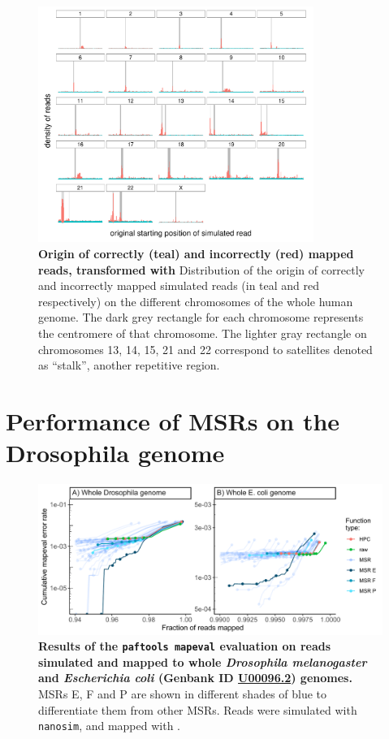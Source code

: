 \documentclass[
  11pt,
  twoside]{scrbook}
\newcommand{\extcaption}[2]{
    \caption[#1]{
        \textbf{#1}\newline
        #2
    }
}
\begin{document}
\begin{figure}[H]
    \centering
    \includegraphics[width=0.8\textwidth]{figures/HPC-MSRs/msr_f2_distrib.centro.pdf}
    \extcaption{Origin of correctly (teal) and incorrectly (red) mapped reads, transformed with \msr{F}}{Distribution of the origin of correctly and incorrectly mapped simulated reads (in teal and red respectively) on the different chromosomes of the whole human genome. The dark grey rectangle for each chromosome represents the centromere of that chromosome. The lighter gray rectangle on chromosomes 13, 14, 15, 21 and 22 correspond to satellites denoted as ``stalk'', another repetitive region.}
    \label{fig:hist-msr-f}
\end{figure}

\hypertarget{performance-of-msrs-on-the-drosophila-genome}{%
\section{Performance of MSRs on the Drosophila genome}\label{performance-of-msrs-on-the-drosophila-genome}}

\begin{figure}[H]
    \centering
    \includegraphics[width=\textwidth]{figures/HPC-MSRs/droso_ecoli.pdf}
    \extcaption{Results of the \texttt{paftools mapeval} evaluation on reads simulated and mapped to whole \textit{Drosophila melanogaster} and \textit{Escherichia coli} (Genbank ID \href{https://www.ncbi.nlm.nih.gov/nuccore/U00096.2}{U00096.2}) genomes.}{MSRs E, F and P are shown in different shades of blue to differentiate them from other MSRs. Reads were simulated with \texttt{nanosim}, and mapped with \minimap.}
    \label{fig:drosophila-results}
\end{figure}
\end{document}
